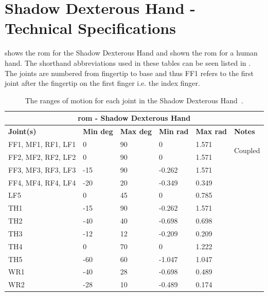 \chapter{Shadow Dexterous Hand - Technical Specifications} \label{app:shadow-dexterous-hand-technical-specifications}

 shows the \gls{rom} for the Shadow Dexterous Hand and  shown the \gls{rom} for a human hand. The shorthand abbreviations used in these tables can be seen listed in . The joints are numbered from fingertip to base and thus FF1 refers to the first joint after the fingertip on the first finger i.e. the index finger.
\begin{table}[h]
\begin{center}
	\begin{tabular}{ |p{}|p{}|p{}|p{}|p{}|p{}| } 
	\hline
	\multicolumn{6}{|c|}{\textbf{\gls{rom} - Shadow Dexterous Hand}} \\ \hline
	\textbf{Joint(s)} & \textbf{Min deg} & \textbf{Max deg} & \textbf{Min rad} & \textbf{Max rad} & \textbf{Notes} \\ \hline
	FF1, MF1, RF1, LF1 &0&90&0&1.571  & \multirow{2}{4em}{Coupled}\\ \cline{1-5}
	FF2, MF2, RF2, LF2 & 0   & 90 & 0      & 1.571 & \\ \hline
	FF3, MF3, RF3, LF3 & -15 & 90 & -0.262 & 1.571 & \\ \hline
	FF4, MF4, RF4, LF4 & -20 & 20 & -0.349 & 0.349 & \\ \hline
	LF5&0&45&0&0.785 &  \\ \hline
	TH1&-15&90&-0.262&1.571 &  \\ \hline
	TH2&-40&40&-0.698&0.698 &  \\ \hline
	TH3&-12&12&-0.209&0.209 &  \\ \hline
	TH4&0&70&0&1.222& \\ \hline
	TH5&-60&60&-1.047&1.047& \\ \hline
	WR1&-40&28&-0.698&0.489& \\ \hline
	WR2&-28&10&-0.489&0.174& \\ \hline
	\end{tabular}
	\caption{The ranges of motion for each joint in the Shadow Dexterous Hand~\cite{range-of-motion-shadow-hand}.}
	\label{app:range-of-motion-shadow-hand}
\end{center}
\end{table}

